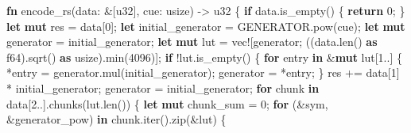 \documentclass[
]{article}
\newenvironment{Shaded}{}{}
\newcommand{\DataTypeTok}[1]{\textcolor[rgb]{0.56,0.13,0.00}{#1}}
\newcommand{\DecValTok}[1]{\textcolor[rgb]{0.25,0.63,0.44}{#1}}
\newcommand{\KeywordTok}[1]{\textcolor[rgb]{0.00,0.44,0.13}{\textbf{#1}}}
\newcommand{\NormalTok}[1]{#1}
\newcommand{\OperatorTok}[1]{\textcolor[rgb]{0.40,0.40,0.40}{#1}}
\newcommand{\PreprocessorTok}[1]{\textcolor[rgb]{0.74,0.48,0.00}{#1}}
\begin{document}
\vfill
\begin{Shaded}
\begin{Highlighting}[]
\KeywordTok{fn}\NormalTok{ encode\_rs(data}\OperatorTok{:} \OperatorTok{\&}\NormalTok{[}\DataTypeTok{u32}\NormalTok{]}\OperatorTok{,}\NormalTok{ cue}\OperatorTok{:} \DataTypeTok{usize}\NormalTok{) }\OperatorTok{{-}\textgreater{}}\NormalTok{ u32 }\OperatorTok{\{}
    \KeywordTok{if}\NormalTok{ data}\OperatorTok{.}\NormalTok{is\_empty() }\OperatorTok{\{}
        \KeywordTok{return}\DecValTok{ 0}\OperatorTok{;}
    \OperatorTok{\}}
    \KeywordTok{let} \KeywordTok{mut}\NormalTok{ res }\OperatorTok{=}\NormalTok{ data[}\DecValTok{0}\NormalTok{]}\OperatorTok{;}
    \KeywordTok{let}\NormalTok{ initial\_generator }\OperatorTok{=} \NormalTok{GENERATOR}\OperatorTok{.}\NormalTok{pow(cue)}\OperatorTok{;}
    \KeywordTok{let} \KeywordTok{mut}\NormalTok{ generator }\OperatorTok{=}\NormalTok{ initial\_generator}\OperatorTok{;}
    \KeywordTok{let} \KeywordTok{mut}\NormalTok{ lut }\OperatorTok{=} \PreprocessorTok{vec!}\NormalTok{[generator}\OperatorTok{;}\NormalTok{ ((data}\OperatorTok{.}\NormalTok{len() }\KeywordTok{as} \DataTypeTok{f64}\NormalTok{)}\OperatorTok{.}\NormalTok{sqrt() }\KeywordTok{as} \DataTypeTok{usize}\NormalTok{)}\OperatorTok{.}\NormalTok{min(}\DecValTok{4096}\NormalTok{)}\NormalTok{]}\OperatorTok{;}
    \KeywordTok{if} \OperatorTok{!}\NormalTok{lut}\OperatorTok{.}\NormalTok{is\_empty() }\OperatorTok{\{}
        \KeywordTok{for}\NormalTok{ entry }\KeywordTok{in} \OperatorTok{\&}\KeywordTok{mut}\NormalTok{ lut[}\DecValTok{1}\OperatorTok{..}\NormalTok{] }\OperatorTok{\{}
            \OperatorTok{*}\NormalTok{entry }\OperatorTok{=}\NormalTok{ generator}\OperatorTok{.}\NormalTok{mul(initial\_generator)}\OperatorTok{;}
\NormalTok{            generator }\OperatorTok{=} \OperatorTok{*}\NormalTok{entry}\OperatorTok{;}
        \OperatorTok{\}}
\NormalTok{        res }\OperatorTok{+=}\NormalTok{ data[}\DecValTok{1}\NormalTok{] }\OperatorTok{*}\NormalTok{ initial\_generator}\OperatorTok{;}
\NormalTok{        generator }\OperatorTok{=}\NormalTok{ initial\_generator}\OperatorTok{;}
        \KeywordTok{for}\NormalTok{ chunk }\KeywordTok{in}\NormalTok{ data[}\DecValTok{2}\OperatorTok{..}\NormalTok{]}\OperatorTok{.}\NormalTok{chunks(lut}\OperatorTok{.}\NormalTok{len()) }\OperatorTok{\{}
            \KeywordTok{let} \KeywordTok{mut}\NormalTok{ chunk\_sum }\OperatorTok{=} \DecValTok{0}\OperatorTok{;}
            \KeywordTok{for}\NormalTok{ (}\OperatorTok{\&}\NormalTok{sym}\OperatorTok{,} \OperatorTok{\&}\NormalTok{generator\_pow) }\KeywordTok{in}\NormalTok{ chunk}\OperatorTok{.}\NormalTok{iter()}\OperatorTok{.}\NormalTok{zip(}\OperatorTok{\&}\NormalTok{lut) }\OperatorTok{\{}

\end{Highlighting}
\end{Shaded}
\end{document}
